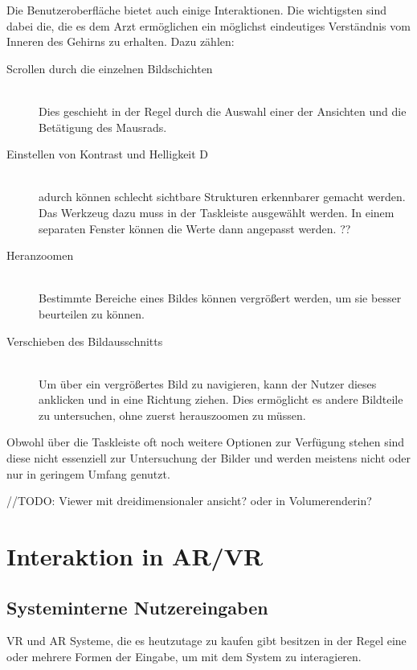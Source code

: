 Die Benutzeroberfläche bietet auch einige Interaktionen. Die wichtigsten sind dabei die, die es dem Arzt ermöglichen ein möglichst eindeutiges Verständnis vom Inneren des Gehirns zu erhalten.  Dazu zählen:

\begin{description}
\item [Scrollen durch die einzelnen Bildschichten]\hfill \\
Dies geschieht in der Regel durch die Auswahl einer der Ansichten und die Betätigung des Mausrads. 
\item [Einstellen von Kontrast und Helligkeit D]\hfill \\
adurch können schlecht sichtbare Strukturen erkennbarer gemacht werden. Das Werkzeug dazu muss in der Taskleiste ausgewählt werden. In einem separaten Fenster können die Werte dann angepasst werden. ??
\item [Heranzoomen]\hfill \\
Bestimmte Bereiche eines Bildes können vergrößert werden, um sie besser beurteilen zu können.
\item [Verschieben des Bildausschnitts]\hfill \\
Um über ein vergrößertes Bild zu navigieren, kann der Nutzer dieses anklicken und in eine Richtung ziehen. Dies ermöglicht es andere Bildteile zu untersuchen, ohne zuerst herauszoomen zu müssen.
\end{description}

Obwohl über die Taskleiste oft noch weitere Optionen zur Verfügung stehen sind diese nicht essenziell zur Untersuchung der Bilder und werden meistens nicht oder nur in geringem Umfang genutzt.

//TODO:
Viewer mit dreidimensionaler ansicht? oder in Volumerenderin?

\section{Interaktion in AR/VR}	
\label{VRInteraktion}							 %
\subsection{Systeminterne Nutzereingaben}

VR und AR Systeme, die es heutzutage zu kaufen gibt besitzen in der Regel  eine oder mehrere Formen der Eingabe, um mit dem System zu interagieren.

